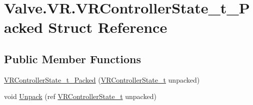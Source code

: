 \hypertarget{struct_valve_1_1_v_r_1_1_v_r_controller_state__t___packed}{}\section{Valve.\+V\+R.\+V\+R\+Controller\+State\+\_\+t\+\_\+\+Packed Struct Reference}
\label{struct_valve_1_1_v_r_1_1_v_r_controller_state__t___packed}
\subsection*{Public Member Functions}
\begin{DoxyCompactItemize}
\item 
\mbox{\hyperlink{struct_valve_1_1_v_r_1_1_v_r_controller_state__t___packed_a06b33d7562d20c8d91ef154d3000a718}{V\+R\+Controller\+State\+\_\+t\+\_\+\+Packed}} (\mbox{\hyperlink{struct_valve_1_1_v_r_1_1_v_r_controller_state__t}{V\+R\+Controller\+State\+\_\+t}} unpacked)
\item 
void \mbox{\hyperlink{struct_valve_1_1_v_r_1_1_v_r_controller_state__t___packed_af12bf87702b21add936a2214c63b0968}{Unpack}} (ref \mbox{\hyperlink{struct_valve_1_1_v_r_1_1_v_r_controller_state__t}{V\+R\+Controller\+State\+\_\+t}} unpacked)
\end{DoxyCompactItemize}
